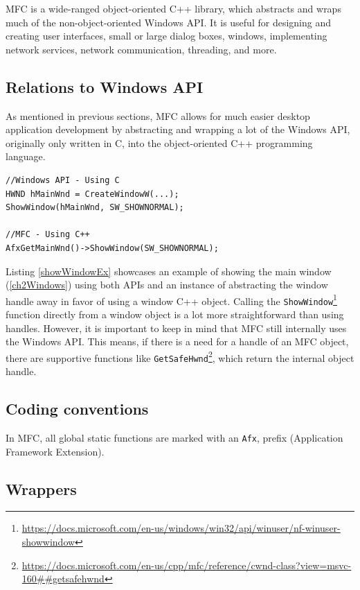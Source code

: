 MFC is a wide-ranged object-oriented C++ library, which abstracts and wraps much of the non-object-oriented Windows API. It is useful for designing and creating user interfaces, small or large dialog boxes, windows, implementing network services, network communication, threading, and more.\cite{MFCDesktop}

\subsection*{Relations to Windows API}
As mentioned in previous sections, MFC allows for much easier desktop application development by abstracting and wrapping a lot of the Windows API, originally only written in C, into the object-oriented C++ programming language.

\begin{lstlisting}[caption={Showing a window using Windows API and MFC}, label=showWindowEx]
//Windows API - Using C
HWND hMainWnd = CreateWindowW(...);
ShowWindow(hMainWnd, SW_SHOWNORMAL);

//MFC - Using C++
AfxGetMainWnd()->ShowWindow(SW_SHOWNORMAL);
\end{lstlisting}

Listing \ref{showWindowEx} showcases an example of showing the main window (\ref{ch2Windows}) using both APIs and an instance of abstracting the window handle away in favor of using a window C++ object. Calling the \lstinline{ShowWindow}\footnote{\url{https://docs.microsoft.com/en-us/windows/win32/api/winuser/nf-winuser-showwindow}} function directly from a window object is a lot more straightforward than using handles. However, it is important to keep in mind that MFC still internally uses the Windows API.
This means, if there is a need for a handle of an MFC object, there are supportive functions like \lstinline{GetSafeHwnd}\footnote{\url{https://docs.microsoft.com/en-us/cpp/mfc/reference/cwnd-class?view=msvc-160##getsafehwnd}}, which return the internal object handle.

\subsection*{Coding conventions}
In MFC, all global static functions are marked with an \lstinline{Afx}, prefix (Application Framework Extension).

\subsection*{Wrappers}

